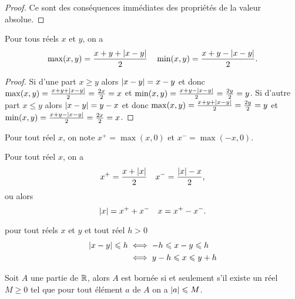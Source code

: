   \begin{proof}
    Ce sont des conséquences immédiates des propriétés de la valeur absolue.
  \end{proof}
  \begin{prop}
    Pour tous réels \(x\) et \(y\), on a
    \begin{equation}
      \max(x, y) = \frac{x + y + \left\lvert x - y\right\rvert}{2} \quad \min(x, y) = \frac{x + y
      - \left\lvert x - y\right\rvert}{2}.
    \end{equation}
  \end{prop}
  \begin{proof}
    Si d'une part \(x\geqslant y\) alors \(\left\lvert x - y\right\rvert = x - y\) et donc
    \(\max(x, y) = \frac{x + y + \left\lvert x - y\right\rvert}{2} = \frac{2x}{2} = x\) et
    \(\min(x, y) = \frac{x + y - \left\lvert x - y\right\rvert}{2} = \frac{2y}{2} = y\). Si
    d'autre part \(x\leqslant y\) alors \(\left\lvert x - y\right\rvert = y - x\) et donc
    \(\max(x, y) = \frac{x + y + \left\lvert x - y\right\rvert}{2} = \frac{2y}{2} = y\) et
    \(\min(x, y) = \frac{x + y - \left\lvert x - y\right\rvert}{2} = \frac{2x}{2} = x\).
  \end{proof}
  \begin{defdef}
    Pour tout réel \(x\), on note \(x^+ = \max(x, 0)\) et \(x^- = \max( - x, 0)\).
  \end{defdef}
  \begin{prop}
    Pour tout réel \(x\), on a
    \begin{equation}
      x^+ = \frac{x + \left\lvert x\right\rvert}{2} \quad x^- = \frac{\left\lvert x\right\rvert - x}{2},
    \end{equation}
    ou alors
    \begin{equation}
        \left\lvert x\right\rvert = x^{+} + x^{-} \quad x = x^{+} - x^{-}.
    \end{equation}
  \end{prop}
  \begin{prop}
    pour tout réels \(x\) et \(y\) et tout réel \(h>0\)
    \begin{align}
      \left\lvert x - y\right\rvert\leqslant h &\iff -h \leqslant x - y \leqslant h\\
                             &\iff y - h \leqslant x \leqslant y + h
    \end{align}
  \end{prop}
  \begin{prop}
    Soit \(A\) une partie de \(\mathbb{R}\), alors \(A\) est bornée si et seulement s'il
    existe un réel \(M\geqslant 0\) tel que pour tout élément \(a\) de \(A\) on
    a \(\left\lvert a\right\rvert\leqslant M\).
  \end{prop}
